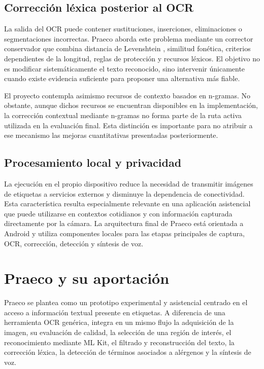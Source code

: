 \subsection{Corrección léxica posterior al OCR}

La salida del OCR puede contener sustituciones, inserciones, eliminaciones o segmentaciones incorrectas. Praeco aborda este problema mediante un corrector conservador que combina distancia de Levenshtein \cite{levenshtein}, similitud fonética, criterios dependientes de la longitud, reglas de protección y recursos léxicos. El objetivo no es modificar sistemáticamente el texto reconocido, sino intervenir únicamente cuando existe evidencia suficiente para proponer una alternativa más fiable.

El proyecto contempla asimismo recursos de contexto basados en n-gramas. No obstante, aunque dichos recursos se encuentran disponibles en la implementación, la corrección contextual mediante n-gramas no forma parte de la ruta activa utilizada en la evaluación final. Esta distinción es importante para no atribuir a ese mecanismo las mejoras cuantitativas presentadas posteriormente.

\subsection{Procesamiento local y privacidad}

La ejecución en el propio dispositivo reduce la necesidad de transmitir imágenes de etiquetas a servicios externos y disminuye la dependencia de conectividad. Esta característica resulta especialmente relevante en una aplicación asistencial que puede utilizarse en contextos cotidianos y con información capturada directamente por la cámara. La arquitectura final de Praeco está orientada a Android y utiliza componentes locales para las etapas principales de captura, OCR, corrección, detección y síntesis de voz.

\section{Praeco y su aportación}

Praeco se plantea como un prototipo experimental y asistencial centrado en el acceso a información textual presente en etiquetas. A diferencia de una herramienta OCR genérica, integra en un mismo flujo la adquisición de la imagen, su evaluación de calidad, la selección de una región de interés, el reconocimiento mediante ML Kit, el filtrado y reconstrucción del texto, la corrección léxica, la detección de términos asociados a alérgenos y la síntesis de voz.

